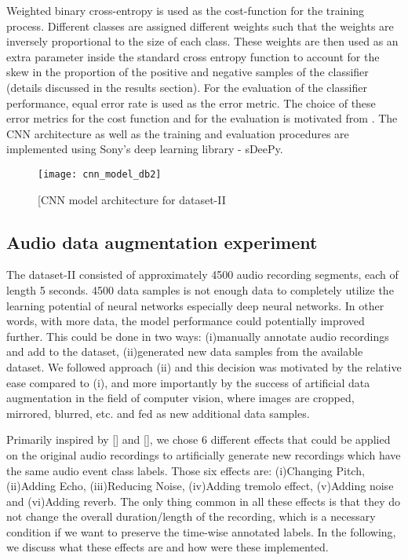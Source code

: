 Weighted binary cross-entropy is used as the cost-function for the training process. Different classes are assigned different weights such that the weights are inversely proportional to the size of each class. These weights are then used as an extra parameter inside the standard cross entropy function to account for the skew in the proportion of the positive and negative samples of the classifier (details discussed in the results section). For the evaluation of the classifier performance, equal error rate is used as the error metric. The choice of these error metrics for the cost function and for the evaluation is motivated from \cite{kons2013audio}. The CNN architecture as well as the training and evaluation procedures are implemented using Sony's deep learning library - sDeePy.

\begin{figure}[!htb] 
\centering 
\texttt{[image: cnn\_model\_db2]}
\caption[CNN model architecture for dataset-II]{[CNN model architecture for dataset-II}
\label{fig:cnn_model_db2} 
\end{figure}

\subsection{Audio data augmentation experiment}
The dataset-II consisted of approximately 4500 audio recording segments, each of length 5 seconds. 4500 data samples is not enough data to completely utilize the learning potential of neural networks especially deep neural networks. In other words, with more data, the model performance could potentially improved further. This could be done in two ways: (i)manually annotate audio recordings and add to the dataset, (ii)generated new data samples from the available dataset. We followed approach (ii) and this decision was motivated by the relative ease compared to (i), and more importantly by the success of artificial data augmentation in the field of computer vision, where images are cropped, mirrored, blurred, etc. and fed as new additional data samples.

Primarily inspired by [] and [], we chose 6 different effects that could be applied on the original audio recordings to artificially generate new recordings which have the same audio event class labels. Those six effects are:  (i)Changing Pitch, (ii)Adding Echo, (iii)Reducing Noise, (iv)Adding tremolo effect, (v)Adding noise and (vi)Adding reverb. The only thing common in all these effects is that they do not change the overall duration/length of the recording, which is a necessary condition if we want to preserve the time-wise annotated labels. In the following, we discuss what these effects are and how were these implemented.

